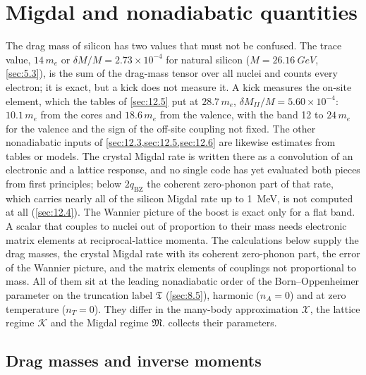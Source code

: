 \section{Migdal and nonadiabatic quantities}\label{app:E.18}

The drag mass of silicon has two values that must not be confused. The trace value, $14\,m_e$ or $\delta M/M = 2.73\times10^{-4}$ for natural silicon ($M = \SI{26.16}{GeV}$, \cref{sec:5.3}), is the sum of the drag-mass tensor over all nuclei and counts every electron; it is exact, but a kick does not measure it. A kick measures the on-site element, which the tables of \cref{sec:12.5} put at $28.7\,m_e$, $\delta M_{II}/M = 5.60\times10^{-4}$: $10.1\,m_e$ from the cores and $18.6\,m_e$ from the valence, with the band 12 to $24\,m_e$ for the valence and the sign of the off-site coupling not fixed. The other nonadiabatic inputs of \cref{sec:12.3,sec:12.5,sec:12.6} are likewise estimates from tables or models. The crystal Migdal rate is written there as a convolution of an electronic and a lattice response, and no single code has yet evaluated both pieces from first principles; below $2q_{\mathrm{BZ}}$ the coherent zero-phonon part of that rate, which carries nearly all of the silicon Migdal rate up to \SI{1}{MeV}, is not computed at all (\cref{sec:12.4}). The Wannier picture of the boost is exact only for a flat band. A scalar that couples to nuclei out of proportion to their mass needs electronic matrix elements at reciprocal-lattice momenta. The calculations below supply the drag masses, the crystal Migdal rate with its coherent zero-phonon part, the error of the Wannier picture, and the matrix elements of couplings not proportional to mass. All of them sit at the leading nonadiabatic order of the Born--Oppenheimer parameter on the truncation label $\mathfrak{T}$ (\cref{sec:8.5}), harmonic ($n_A = 0$) and at zero temperature ($n_T = 0$). They differ in the many-body approximation $\mathcal{X}$, the lattice regime $\mathcal{K}$ and the Migdal regime $\mathfrak{M}$.  collects their parameters.

\subsection{Drag masses and inverse moments}\label{app:E.18-drag}

